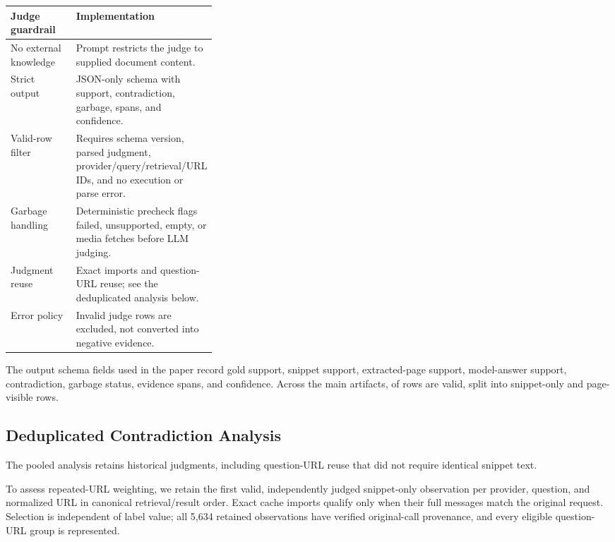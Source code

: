 \begin{center}
\footnotesize
\begin{tabularx}{\linewidth}{@{}L{0.34\linewidth}Z@{}}
\toprule
\textbf{Judge guardrail} & \textbf{Implementation} \\
\midrule
No external knowledge & Prompt restricts the judge to supplied document content. \\
Strict output & JSON-only schema with support, contradiction, garbage, spans, and confidence. \\
Valid-row filter & Requires schema version, parsed judgment, provider/query/retrieval/URL IDs, and no execution or parse error. \\
Garbage handling & Deterministic precheck flags failed, unsupported, empty, or media fetches before LLM judging. \\
Judgment reuse & Exact imports and question-URL reuse; see the deduplicated analysis below. \\
Error policy & Invalid judge rows are excluded, not converted into negative evidence. \\
\bottomrule
\end{tabularx}
\end{center}

The output schema fields used in the paper record gold support, snippet support, extracted-page support, model-answer support, contradiction, garbage status, evidence spans, and confidence. Across the main artifacts, \NJudgeValid{} of \NJudgeTotal{} rows are valid, split into \NJudgeSnippetValid{} snippet-only and \NJudgePageValid{} page-visible rows.

\subsection{Deduplicated Contradiction Analysis}
\label{app:cache-sensitivity}
The pooled analysis retains historical judgments, including question-URL reuse that did not require identical snippet text.

To assess repeated-URL weighting, we retain the first valid, independently judged snippet-only observation per provider, question, and normalized URL in canonical retrieval/result order. Exact cache imports qualify only when their full messages match the original request. Selection is independent of label value; all 5,634 retained observations have verified original-call provenance, and every eligible question-URL group is represented.

